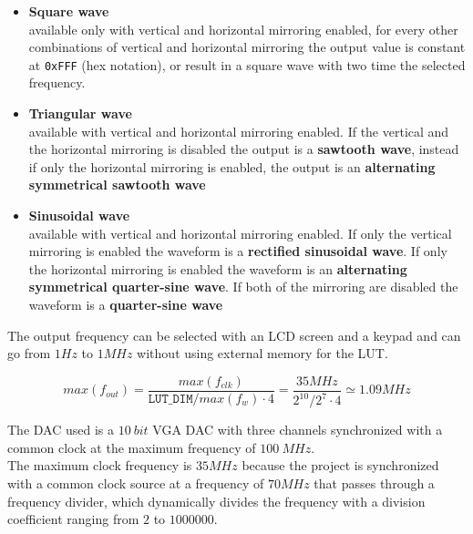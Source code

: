 \begin{itemize}

    \item \textbf{Square wave} \\
    available only with vertical and horizontal mirroring enabled, for every other combinations of vertical and horizontal mirroring the output value is constant at \texttt{0xFFF} (hex notation), or result in a square wave with two time the selected frequency.
    
    \item \textbf{Triangular wave} \\
    available with vertical and horizontal mirroring enabled.
    If the vertical and the horizontal mirroring is disabled the output is a \textbf{sawtooth wave},
    instead if only the horizontal mirroring is enabled, the output is an \textbf{alternating symmetrical sawtooth wave}
    
    \item \textbf{Sinusoidal wave} \\
    available with vertical and horizontal mirroring enabled.
    If only the vertical mirroring is enabled the waveform is a \textbf{rectified sinusoidal wave}.
    If only the horizontal mirroring is enabled the waveform is an \textbf{alternating symmetrical quarter-sine wave}.
    If both of the mirroring are disabled the waveform is a \textbf{quarter-sine wave}
    
\end{itemize}

\noindent
The output frequency can be selected with an LCD screen and a keypad and can go from \(1Hz\) to \(1MHz\) without using external memory for the LUT.

\vspace{0.5cm}
\[
    max(f_{out}) = \frac{max(f_{clk})}{\texttt{LUT\_DIM}/max(f_w) \cdot 4} = \frac{35MHz}{2^{10}/2^7 \cdot 4} \simeq 1.09MHz
\]
\vspace{0.5cm}

\noindent
The DAC used is a \(10 \ bit\) VGA DAC with three channels synchronized with a common clock at the maximum frequency of \(100 \ MHz\). \\
The maximum clock frequency is \(35MHz\) because the project is synchronized with a common clock source at a frequency of \(70MHz\) that passes through a frequency divider, which dynamically divides the frequency with a division coefficient ranging from \(2\) to \(1000000\).

\newpage

